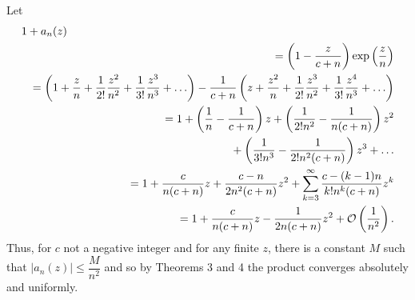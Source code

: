 \begin{solution}
Let
\begin{eqnarray*}
\lefteqn{1+a_n(z)} \\
& &= \left( 1 - \dfrac{z}{c+n} \right) \exp \left( \dfrac{z}{n} \right) \\
& &= \left( 1 + \dfrac{z}{n} + \dfrac{1}{2!} \dfrac{z^2}{n^2} + \dfrac{1}{3!} \dfrac{z^3}{n^3} + \ldots \right) - \dfrac{1}{c+n} \left( z + \dfrac{z^2}{n} + \dfrac{1}{2!} \dfrac{z^3}{n^2} + \dfrac{1}{3!} \dfrac{z^4}{n^3} + \ldots \right) \\
& &= 1 + \left( \dfrac{1}{n} - \dfrac{1}{c+n} \right)z + \left( \dfrac{1}{2!n^2} - \dfrac{1}{n(c+n)} \right) z^2 \\
& & \phantom{=}+ \left( \dfrac{1}{3!n^3} - \dfrac{1}{2! n^2(c+n)} \right) z^3 + \ldots \\
& &= 1 + \dfrac{c}{n(c+n)}z + \dfrac{c-n}{2n^2(c+n)}z^2 + \displaystyle\sum_{k=3}^{\infty} \dfrac{c - (k-1)n}{k! n^k (c+n)} z^k \\
& &= 1 + \dfrac{c}{n(c+n)}z - \dfrac{1}{2n(c+n)} z^2 + \mathcal{O} \left( \dfrac{1}{n^2} \right).
\end{eqnarray*}
Thus, for $c$ not a negative integer and for any finite $z$, there is a constant $M$ such that $|a_n(z)| \leq \dfrac{M}{n^2}$ and so by Theorems 3 and 4 the product converges absolutely and uniformly.
\end{solution}
